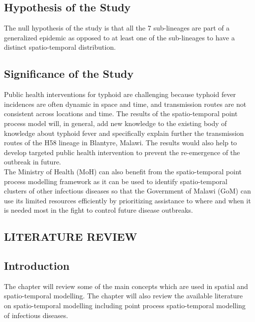 \documentclass[a4paper]{thesis}
\begin{document}
\section{Hypothesis of the Study}

The null hypothesis of the study is that all the 7 sub-lineages are part of a generalized epidemic as opposed to at least one of the sub-lineages to have a distinct spatio-temporal distribution.

\section{Significance of the Study}

Public health interventions for typhoid are challenging because typhoid fever incidences are often dynamic in space and time, and transmission routes are not consistent across locations and time. The results of the spatio-temporal point process model will, in general, add new knowledge to the existing body of knowledge about typhoid fever and specifically explain further the transmission routes of the H58 lineage in Blantyre, Malawi. The results would also help to develop targeted public health intervention to prevent the re-emergence of the outbreak in future. \\

The Ministry of Health (MoH) can also benefit from the spatio-temporal point process modelling framework as it can be used to identify spatio-temporal clusters of other infectious diseases so that the Government of Malawi (GoM) can use its limited resources efficiently by prioritizing assistance to where and when it is needed most in the fight to control future disease outbreaks.


\begin{center}
\chapter{LITERATURE REVIEW}
\end{center} 

\section{Introduction}

The chapter will review some of the main concepts which are used in spatial and spatio-temporal modelling. The chapter will also review the available literature on spatio-temporal modelling including point process spatio-temporal modelling of infectious diseases.
\end{document}
